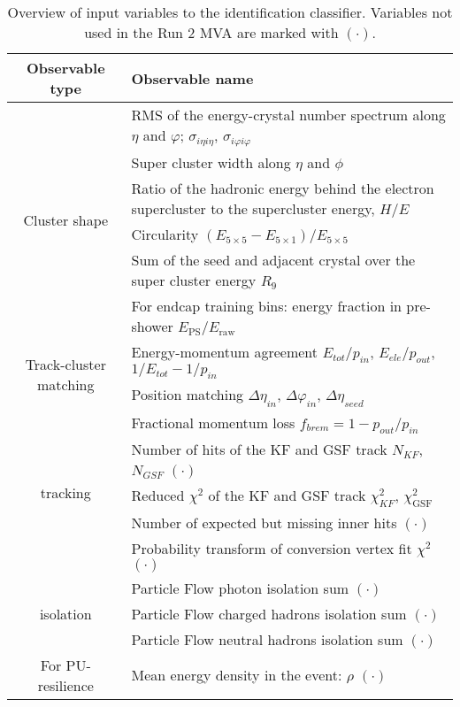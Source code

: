 \begin{table}[ht]
\scriptsize
   \centering
   \begin{tabular}{c|l}
\hline
\hline
Observable type & Observable name \\
\hline
\multirow{6}{*}{Cluster shape}
	& RMS of the energy-crystal number spectrum along $\eta$ and $\varphi$; $\sigma_{i\eta i\eta}$, $\sigma_{i\varphi i\varphi}$ \\
	& Super cluster width along $\eta$ and $\phi$ \\
	& Ratio of the hadronic energy behind the electron supercluster to the supercluster energy, $H/E$ \\
	& Circularity $(E_{5\times5} - E_{5\times1})/E_{5\times5}$ \\
	& Sum of the seed and adjacent crystal over the super cluster energy $R_{9}$ \\
	& For endcap training bins: energy fraction in pre-shower $E_\text{PS}/E_\text{raw}$ \\
\hline
\multirow{2}{*}{Track-cluster matching}
	& Energy-momentum agreement $E_{tot}/p_{in}$, $E_{ele}/p_{out}$, $1/E_{tot} - 1/p_{in}$ \\
	& Position matching $\Delta\eta_{in}$, $\Delta\varphi_{in}$, $\Delta\eta_{seed}$ \\
\hline
\multirow{5}{*}{tracking}
   & Fractional momentum loss $f_{brem} = 1 - p_{out}/p_{in}$ \\
   & Number of hits of the KF and GSF track $N_{KF}$, $N_{GSF}$ $(\mathord{\cdot})$ \\
   & Reduced $\chi^2$ of the KF and GSF track $\chi^{2}_{KF}$, $\chi^{2}_{\textrm{GSF}}$ \\
   & Number of expected but missing inner hits $(\mathord{\cdot})$ \\
   & Probability transform of conversion vertex fit $\chi^2$ $(\mathord{\cdot})$ \\
\hline
\multirow{3}{*}{isolation}
   & Particle Flow photon isolation sum $(\mathord{\cdot})$ \\
   & Particle Flow charged hadrons isolation sum $(\mathord{\cdot})$ \\
   & Particle Flow neutral hadrons isolation sum $(\mathord{\cdot})$ \\
\hline
\multirow{1}{*}{For PU-resilience}
   & Mean energy density in the event: $\rho$ $(\mathord{\cdot})$ \\
\hline
\hline
     \end{tabular}
\small
    \caption{Overview of input variables to the identification classifier. Variables not used in the Run 2 MVA are marked with  $(\mathord{\cdot})$.}
    \label{tab:ele_ID_input_variables}
\end{table}


